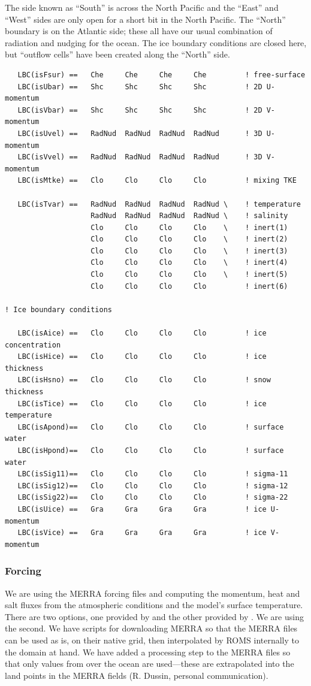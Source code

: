 The side known as ``South'' is across the North Pacific and the
``East'' and ``West'' sides are only open for a short bit in the
North Pacific. The ``North'' boundary is on the Atlantic side; these
all have our usual combination of radiation and nudging for the
ocean. The ice boundary conditions are closed here, but ``outflow
cells'' have been created along the ``North'' side.
\begin{verbatim}
   LBC(isFsur) ==   Che     Che     Che     Che         ! free-surface
   LBC(isUbar) ==   Shc     Shc     Shc     Shc         ! 2D U-momentum
   LBC(isVbar) ==   Shc     Shc     Shc     Shc         ! 2D V-momentum
   LBC(isUvel) ==   RadNud  RadNud  RadNud  RadNud      ! 3D U-momentum
   LBC(isVvel) ==   RadNud  RadNud  RadNud  RadNud      ! 3D V-momentum
   LBC(isMtke) ==   Clo     Clo     Clo     Clo         ! mixing TKE

   LBC(isTvar) ==   RadNud  RadNud  RadNud  RadNud \    ! temperature
                    RadNud  RadNud  RadNud  RadNud \    ! salinity
                    Clo     Clo     Clo     Clo    \    ! inert(1)
                    Clo     Clo     Clo     Clo    \    ! inert(2)
                    Clo     Clo     Clo     Clo    \    ! inert(3)
                    Clo     Clo     Clo     Clo    \    ! inert(4)
                    Clo     Clo     Clo     Clo    \    ! inert(5)
                    Clo     Clo     Clo     Clo         ! inert(6)

! Ice boundary conditions

   LBC(isAice) ==   Clo     Clo     Clo     Clo         ! ice concentration
   LBC(isHice) ==   Clo     Clo     Clo     Clo         ! ice thickness
   LBC(isHsno) ==   Clo     Clo     Clo     Clo         ! snow thickness
   LBC(isTice) ==   Clo     Clo     Clo     Clo         ! ice temperature
   LBC(isApond)==   Clo     Clo     Clo     Clo         ! surface water
   LBC(isHpond)==   Clo     Clo     Clo     Clo         ! surface water
   LBC(isSig11)==   Clo     Clo     Clo     Clo         ! sigma-11
   LBC(isSig12)==   Clo     Clo     Clo     Clo         ! sigma-12
   LBC(isSig22)==   Clo     Clo     Clo     Clo         ! sigma-22
   LBC(isUice) ==   Gra     Gra     Gra     Gra         ! ice U-momentum
   LBC(isVice) ==   Gra     Gra     Gra     Gra         ! ice V-momentum

\end{verbatim}

\subsubsection{Forcing}
We are using the MERRA forcing files \citep{Rienecker_2011} and
computing the momentum, heat and salt fluxes from the atmospheric
conditions and the model's surface temperature. There are two
options, one provided by  and the other provided
by . We are using the second. We have 
scripts for downloading MERRA so that the MERRA files can be used
as is, on their native grid, then interpolated by ROMS internally
to the domain at hand.  We have added a processing step to the MERRA
files so that only values from over the ocean are used---these are
extrapolated into the land points in the MERRA fields (R. Dussin,
personal communication).


